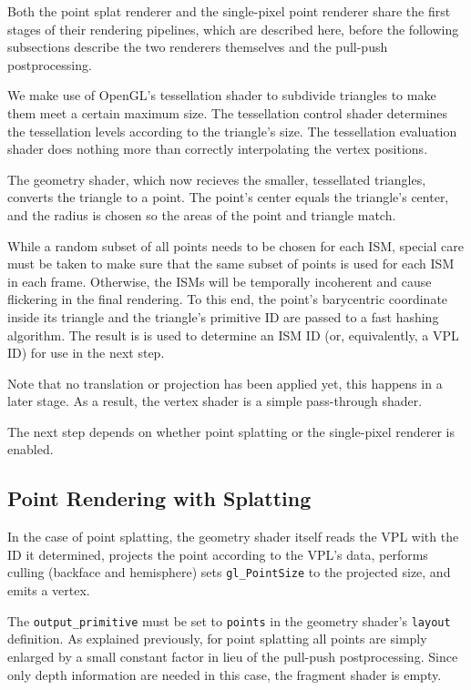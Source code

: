  Both the point splat renderer and the single-pixel point renderer share the first stages of their rendering pipelines, which are described here, before the following subsections describe the two renderers themselves and the pull-push postprocessing.

 We make use of OpenGL's tessellation shader to subdivide triangles to make them meet a certain maximum size. The tessellation control shader determines the tessellation levels according to the triangle's size. The tessellation evaluation shader does nothing more than correctly interpolating the vertex positions.

 The geometry shader, which now recieves the smaller, tessellated triangles, converts the triangle to a point. The point's center equals the triangle's center, and the radius is chosen so the areas of the point and triangle match.

 While a random subset of all points needs to be chosen for each ISM, special care must be taken to make sure that the same subset of points is used for each ISM in each frame. Otherwise, the ISMs will be temporally incoherent and cause flickering in the final rendering. To this end, the point's barycentric coordinate inside its triangle and the triangle's primitive ID are passed to a fast hashing algorithm. The result is is used to determine an ISM ID (or, equivalently, a VPL ID) for use in the next step.

 Note that no translation or projection has been applied yet, this happens in a later stage. As a result, the vertex shader is a simple pass-through shader.

 The next step depends on whether point splatting or the single-pixel renderer is enabled.



 \subsection{Point Rendering with Splatting}

 In the case of point splatting, the geometry shader itself reads the VPL with the ID it determined, projects the point according to the VPL's data, performs culling (backface and hemisphere) sets \texttt{gl\_PointSize} to the projected size, and emits a vertex.

 The \texttt{output\_primitive} must be set to \texttt{points} in the geometry shader's \texttt{layout} definition. As explained previously, for point splatting all points are simply enlarged by a small constant factor in lieu of the pull-push postprocessing. Since only depth information are needed in this case, the fragment shader is empty.



